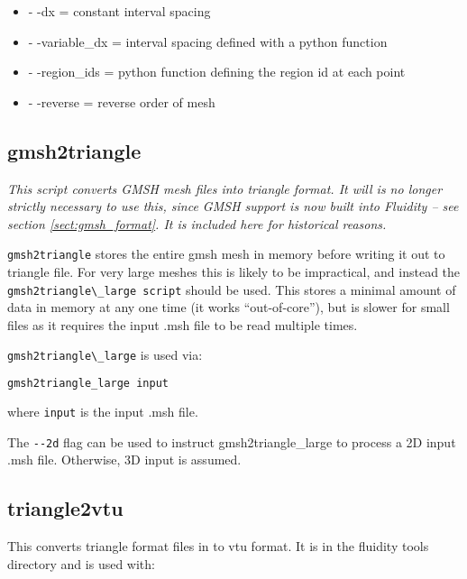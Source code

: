 \begin{itemize}
\item - -dx = constant interval spacing
\item - -variable\_dx = interval spacing defined with a python function
\item - -region\_ids = python function defining the region id at each point
\item - -reverse = reverse order of mesh
\end{itemize}



\subsection{gmsh2triangle}

\textit{This script converts GMSH mesh files into triangle format. It will is no longer strictly necessary to use this, since GMSH support is now built into Fluidity -- see section \ref{sect:gmsh_format}. It is included here for historical reasons.}

\lstinline[language=Bash]{gmsh2triangle} stores the entire gmsh mesh in memory before writing it out to
triangle file. For very large meshes this is likely to be impractical,
and instead the \lstinline[language=Bash]{gmsh2triangle\_large script}
should be used. This stores a minimal
amount of data in memory at any one time (it works ``out-of-core''), but
is slower for small files as it requires the input .msh file to be read multiple
times.

\lstinline[language=Bash]{gmsh2triangle\_large} is used via:

\begin{lstlisting}[language = Bash]
gmsh2triangle_large input
\end{lstlisting}

where \lstinline[language = Bash]*input* is the input .msh file.

The \lstinline[language = Bash]+--2d+ flag can be used to instruct gmsh2triangle\_large
to process a 2D input .msh file. Otherwise, 3D input is assumed.

\subsection{triangle2vtu}
This converts triangle format files in to vtu format. It is in the fluidity tools directory and is used with:

